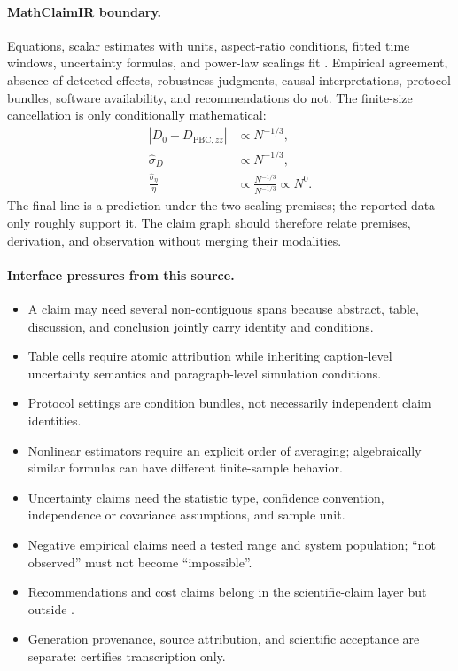 \paragraph{MathClaimIR boundary.}
Equations, scalar estimates with units, aspect-ratio conditions, fitted time windows, uncertainty formulas, and power-law scalings fit \MathClaimIR{}. Empirical agreement, absence of detected effects, robustness judgments, causal interpretations, protocol bundles, software availability, and recommendations do not. The finite-size cancellation is only conditionally mathematical:
\begin{align}
\left|D_0-D_{\mathrm{PBC},zz}\right|
  &\propto N^{-1/3},\\
\widehat{\sigma}_{D}
  &\propto N^{-1/3},\\
\frac{\widehat{\sigma}_{\eta}}{\eta}
  &\propto \frac{N^{-1/3}}{N^{-1/3}}
   \propto N^0.
\end{align}
The final line is a prediction under the two scaling premises; the reported data only roughly support it. The claim graph should therefore relate premises, derivation, and observation without merging their modalities.

\paragraph{Interface pressures from this source.}
\begin{itemize}
\item A claim may need several non-contiguous spans because abstract, table, discussion, and conclusion jointly carry identity and conditions.
\item Table cells require atomic attribution while inheriting caption-level uncertainty semantics and paragraph-level simulation conditions.
\item Protocol settings are condition bundles, not necessarily independent claim identities.
\item Nonlinear estimators require an explicit order of averaging; algebraically similar formulas can have different finite-sample behavior.
\item Uncertainty claims need the statistic type, confidence convention, independence or covariance assumptions, and sample unit.
\item Negative empirical claims need a tested range and system population; ``not observed'' must not become ``impossible''.
\item Recommendations and cost claims belong in the scientific-claim layer but outside \MathClaimIR{}.
\item Generation provenance, source attribution, and scientific acceptance are separate:  certifies transcription only.
\end{itemize}

